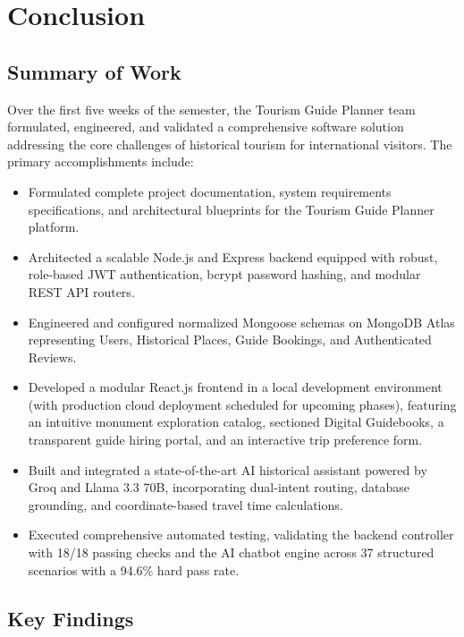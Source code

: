 \documentclass[12pt,a4paper,twoside,openright]{report}
\begin{document}
\chapter{Conclusion}

\section{Summary of Work}

Over the first five weeks of the semester, the Tourism Guide Planner team formulated, engineered, and validated a comprehensive software solution addressing the core challenges of historical tourism for international visitors. The primary accomplishments include:

\begin{itemize}[leftmargin=*]
    \item Formulated complete project documentation, system requirements specifications, and architectural blueprints for the Tourism Guide Planner platform.
    \item Architected a scalable Node.js and Express backend equipped with robust, role-based JWT authentication, bcrypt password hashing, and modular REST API routers.
    \item Engineered and configured normalized Mongoose schemas on MongoDB Atlas representing Users, Historical Places, Guide Bookings, and Authenticated Reviews.
    \item Developed a modular React.js frontend in a local development environment (with production cloud deployment scheduled for upcoming phases), featuring an intuitive monument exploration catalog, sectioned Digital Guidebooks, a transparent guide hiring portal, and an interactive trip preference form.
    \item Built and integrated a state-of-the-art AI historical assistant powered by Groq and Llama 3.3 70B, incorporating dual-intent routing, database grounding, and coordinate-based travel time calculations.
    \item Executed comprehensive automated testing, validating the backend controller with 18/18 passing checks and the AI chatbot engine across 37 structured scenarios with a 94.6\% hard pass rate.
\end{itemize}

\section{Key Findings}
\end{document}
